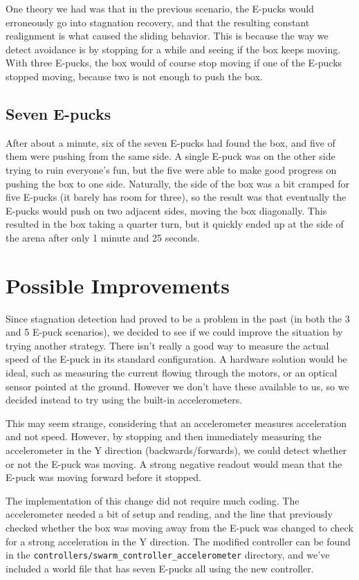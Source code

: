 \documentclass[a4paper,12pt]{article}
\begin{document}
One theory we had was that in the previous scenario, the E-pucks would erroneously go into stagnation recovery, and that the resulting constant realignment is what caused the sliding behavior. This is because the way we detect avoidance is by stopping for a while and seeing if the box keeps moving. With three E-pucks, the box would of course stop moving if one of the E-pucks stopped moving, because two is not enough to push the box.

\subsection{Seven E-pucks}
After about a minute, six of the seven E-pucks had found the box, and five of them were pushing from the same side. A single E-puck was on the other side trying to ruin everyone's fun, but the five were able to make good progress on pushing the box to one side. Naturally, the side of the box was a bit cramped for five E-pucks (it barely has room for three), so the result was that eventually the E-pucks would push on two adjacent sides, moving the box diagonally. This resulted in the box taking a quarter turn, but it quickly ended up at the side of the arena after only 1 minute and 25 seconds.

\section{Possible Improvements}
Since stagnation detection had proved to be a problem in the past (in both the 3 and 5 E-puck scenarios), we decided to see if we could improve the situation by trying another strategy. There isn't really a good way to measure the actual speed of the E-puck in its standard configuration. A hardware solution would be ideal, such as measuring the current flowing through the motors, or an optical sensor pointed at the ground. However we don't have these available to us, so we decided instead to try using the built-in accelerometers.

This may seem strange, considering that an accelerometer measures acceleration and not speed. However, by stopping and then immediately measuring the accelerometer in the Y direction (backwards/forwards), we could detect whether or not the E-puck was moving. A strong negative readout would mean that the E-puck was moving forward before it stopped.

The implementation of this change did not require much coding. The accelerometer needed a bit of setup and reading, and the line that previously checked whether the box was moving away from the E-puck was changed to check for a strong acceleration in the Y direction. The modified controller can be found in the \texttt{controllers/swarm\_controller\_accelerometer} directory, and we've included a world file that has seven E-pucks all using the new controller.
\end{document}
